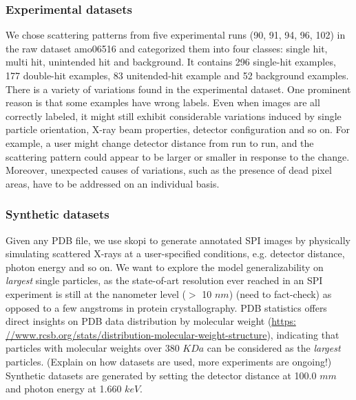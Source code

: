 
\subsubsection{Experimental datasets}


We chose scattering patterns from five experimental runs (90, 91, 94, 96, 102)
in the raw dataset amo06516 and categorized them into four classes: single hit,
multi hit, unintended hit and background.  It contains 296 single-hit examples,
177 double-hit examples, 83 unitended-hit example and 52 background examples.
There is a variety of variations found in the experimental dataset.  One
prominent reason is that some examples have wrong labels. Even when images are
all correctly labeled, it might still exhibit considerable variations induced by
single particle orientation, X-ray beam properties, detector configuration and
so on.  For example, a user might change detector distance from run to run, and
the scattering pattern could appear to be larger or smaller in response to the
change. Moreover, unexpected causes of variations, such as the presence of dead
pixel areas, have to be addressed on an individual basis.  



\subsubsection{Synthetic datasets}

Given any PDB file, we use skopi \cite{peckSkopiSimulationPackage2021} to
generate annotated SPI images by physically simulating scattered X-rays at a
user-specified conditions, e.g. detector distance, photon energy and so on. We
want to explore the model generalizability on \textit{largest} single particles,
as the state-of-art resolution ever reached in an SPI experiment is still at the
nanometer level ($>$ 10 $nm$) {\color{red}(need to fact-check)} as opposed to a
few angstroms in protein crystallography.  PDB statistics offers direct insights
on PDB data distribution by molecular weight (\url{https:
//www.rcsb.org/stats/distribution-molecular-weight-structure}), indicating that
particles with molecular weights over 380 $KDa$ can be considered as the
\textit{largest} particles.  {\color{red}(Explain on how datasets are used, more
experiments are ongoing!)} Synthetic datasets are generated by setting the
detector distance at 100.0 $mm$ and photon energy at 1.660 $keV$.  

